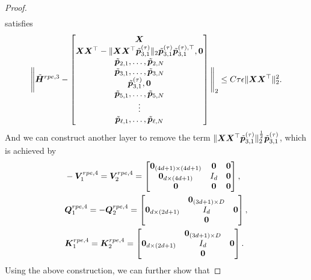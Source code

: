 \begin{proof}
\begin{align*}
    \end{align*}
    satisfies
    \begin{align*}
       \Bigg\Vert \tilde{\boldsymbol{H}}^{rpe,3}-\begin{bmatrix}
            \boldsymbol{X}\\
            \boldsymbol{X}\boldsymbol{X}^\top-\Vert\boldsymbol{X}\boldsymbol{X}^\top\tilde{\boldsymbol{p}}_{3,1}^{(\tau)}\Vert_2\tilde{\boldsymbol{p}}_{3,1}^{(\tau)}\tilde{\boldsymbol{p}}_{3,1}^{(\tau),\top},\boldsymbol{0}\\
            \tilde{\boldsymbol{p}}_{2,1},\ldots,\tilde{\boldsymbol{p}}_{2,N}\\
            \tilde{\boldsymbol{p}}_{3,1},\ldots,\tilde{\boldsymbol{p}}_{3,N}\\
            \tilde{\boldsymbol{p}}_{3,1}^{(\tau)},\boldsymbol{0}\\
            \tilde{\boldsymbol{p}}_{5,1},\ldots,\tilde{\boldsymbol{p}}_{5,N}\\
            \vdots\\
            \tilde{\boldsymbol{p}}_{\ell,1},\ldots,\tilde{\boldsymbol{p}}_{\ell,N}
        \end{bmatrix}\Bigg\Vert_2\leq C\tau\epsilon\Vert\boldsymbol{X}\boldsymbol{X}^\top\Vert_2^2.
    \end{align*}
    And we can construct another layer to remove the term $\Vert\boldsymbol{X}\boldsymbol{X}^\top\tilde{\boldsymbol{p}}_{3,1}^{(\tau)}\Vert_2^{\frac{1}{2}}\tilde{\boldsymbol{p}}_{3,1}^{(\tau)}$, which is achieved by 
    \begin{align*}
        &-\boldsymbol{V}_1^{rpe,4} = \boldsymbol{V}_2^{rpe,4} =  \begin{bmatrix}
            \boldsymbol{0}_{(4d+1)\times(4d+1)}&\boldsymbol{0}&\boldsymbol{0}\\
            \boldsymbol{0}_{d\times(4d+1)}& I_d&\boldsymbol{0}\\
            \boldsymbol{0}&\boldsymbol{0}&\boldsymbol{0}
        \end{bmatrix},\\
        &\boldsymbol{Q}_1^{rpe,4} = -\boldsymbol{Q}_2^{rpe,4}=\begin{bmatrix}
            &\boldsymbol{0}_{(3d+1)\times D}&\\
            \boldsymbol{0}_{d\times (2d+1)}& I_d&\boldsymbol{0}\\
            &\boldsymbol{0}&
        \end{bmatrix},\\
        &\boldsymbol{K}_1^{rpe,4}= \boldsymbol{K}_2^{rpe,4} =\begin{bmatrix}
            &\boldsymbol{0}_{(3d+1)\times D}&\\
            \boldsymbol{0}_{d\times (2d+1)}& I_d&\boldsymbol{0}\\
            &\boldsymbol{0}&
        \end{bmatrix}.
    \end{align*}
    Using the above construction, we can further show that

\end{proof}
